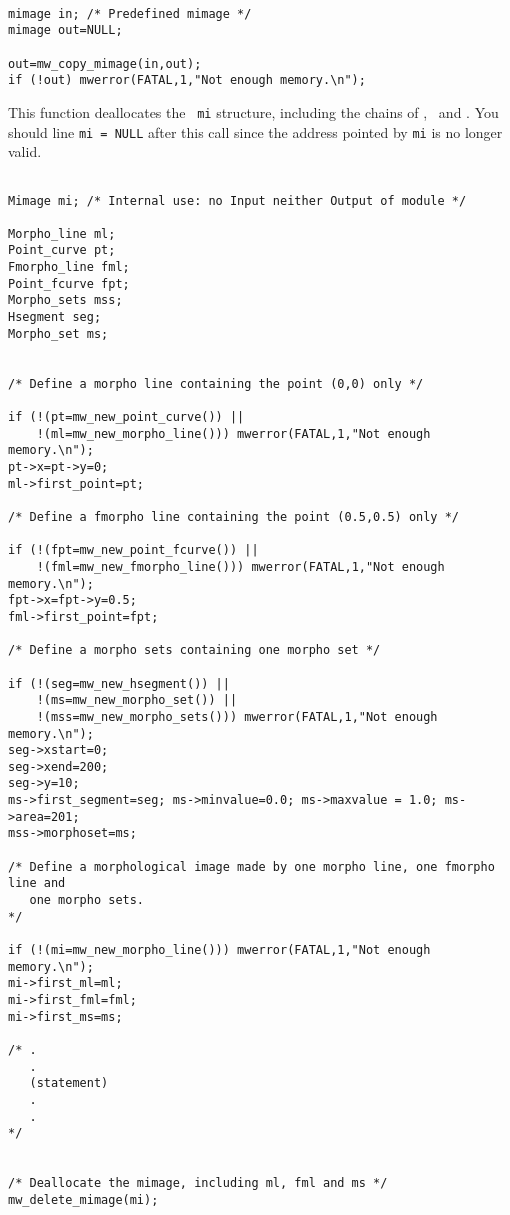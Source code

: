 \Next
\Example
\begin{verbatim}

mimage in; /* Predefined mimage */
mimage out=NULL; 

out=mw_copy_mimage(in,out);
if (!out) mwerror(FATAL,1,"Not enough memory.\n");
\end{verbatim}

\newpage %


\Description
This function deallocates the \mimage\ \verb+mi+ structure, including the
chains of \msets, \mline\ and \fmline.
You should line \verb+mi = NULL+ after this call since the address pointed
by \verb+mi+ is no longer valid.

\Next
\Example
\begin{verbatim}

Mimage mi; /* Internal use: no Input neither Output of module */

Morpho_line ml; 
Point_curve pt;
Fmorpho_line fml; 
Point_fcurve fpt;
Morpho_sets mss;
Hsegment seg;
Morpho_set ms;


/* Define a morpho line containing the point (0,0) only */

if (!(pt=mw_new_point_curve()) ||
    !(ml=mw_new_morpho_line())) mwerror(FATAL,1,"Not enough memory.\n");
pt->x=pt->y=0;
ml->first_point=pt;

/* Define a fmorpho line containing the point (0.5,0.5) only */

if (!(fpt=mw_new_point_fcurve()) ||
    !(fml=mw_new_fmorpho_line())) mwerror(FATAL,1,"Not enough memory.\n");
fpt->x=fpt->y=0.5;
fml->first_point=fpt;

/* Define a morpho sets containing one morpho set */

if (!(seg=mw_new_hsegment()) ||
    !(ms=mw_new_morpho_set()) ||
    !(mss=mw_new_morpho_sets())) mwerror(FATAL,1,"Not enough memory.\n");
seg->xstart=0; 
seg->xend=200;
seg->y=10;
ms->first_segment=seg; ms->minvalue=0.0; ms->maxvalue = 1.0; ms->area=201;
mss->morphoset=ms;

/* Define a morphological image made by one morpho line, one fmorpho line and
   one morpho sets.
*/

if (!(mi=mw_new_morpho_line())) mwerror(FATAL,1,"Not enough memory.\n");
mi->first_ml=ml;
mi->first_fml=fml;
mi->first_ms=ms;

/* .
   .
   (statement)
   .
   .
*/


/* Deallocate the mimage, including ml, fml and ms */
mw_delete_mimage(mi);

\end{verbatim}

